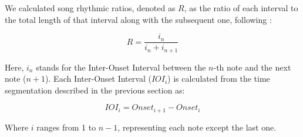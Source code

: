 We calculated song rhythmic ratios, denoted as $R$, as the ratio of each interval to the total length of that interval along with the subsequent one, following \textcite{roeske2020, xing2022}:

\begin{equation}
R = \frac{i_{n}}{i_{n} + i_{n+1}}
\end{equation}

\noindent Here, $i_{n}$ stands for the Inter-Onset Interval between the $n$-th note and the next note ($n+1$). Each Inter-Onset Interval ($IOI_i$) is calculated from the time segmentation described in the previous section as:

\begin{equation}
IOI_i = Onset_{i+1} - Onset_i
\end{equation}

\noindent Where $i$ ranges from 1 to $n-1$, representing each note except the last one.


